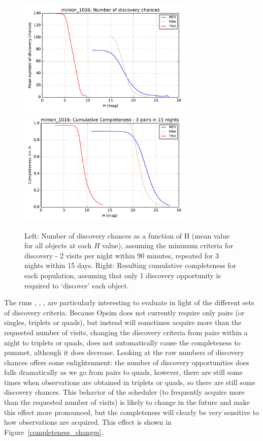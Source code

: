 \begin{figure}
\includegraphics[width=3.3in]{figs/solarsystem/minion_1016_DiscoveryChances_tno_mba_neo_10_year_3_pairs_in_15_nights_MOOB_ComboMetricVsH}
\includegraphics[width=3.3in]{figs/solarsystem/minion_1016_CumulativeCompleteness_tno_mba_neo_10_year_3_pairs_in_15_nights_MOOB_ComboMetricVsH}
\caption{Left: Number of discovery chances as a function of H
  (mean value for all objects at each $H$ value), assuming the minimum criteria for
  discovery - 2 visits per night within 90 minutes, repeated for 3
  nights within 15 days. Right: Resulting cumulative completeness for
  each population, assuming that only 1 discovery opportunity is
  required to `discover' each object.
\label{standard_discovery}}
\end{figure}

The runs , ,
, 
are particularly interesting to evaluate in light of the different
sets of discovery criteria. Because Opsim does not currently require
only pairs (or singles, triplets or quads), but instead will sometimes
acquire more than the requested number of visits, changing the
discovery criteria from pairs within a night to triplets or quads,
does not automatically cause the completeness to pummet, although it
does decrease. Looking at the raw numbers of discovery chances offers some
enlightenment: the number of discovery opportunities does falls dramatically as we go from pairs to quads, however, there
are still some times when observations are obtained in triplets or
quads, so there are still some discovery chances. This behavior of the
scheduler (to frequently acquire more than the requested number of
visits) is likely to change in the future and make this effect more pronounced, but the completeness will
clearly be very sensitive to how observations are acquired. This effect is shown in
Figure~\ref{completeness_changes}. 

